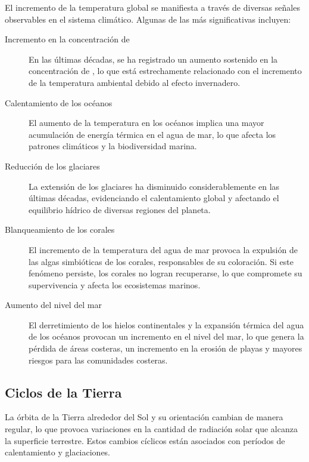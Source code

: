 El incremento de la temperatura global se manifiesta a través de diversas señales observables en el sistema climático. Algunas de las más significativas incluyen:

\begin{description}
    \item[Incremento en la concentración de ] En las últimas décadas, se ha registrado un aumento sostenido en la concentración de , lo que está estrechamente relacionado con el incremento de la temperatura ambiental debido al efecto invernadero.
    
    \item[Calentamiento de los océanos] El aumento de la temperatura en los océanos implica una mayor acumulación de energía térmica en el agua de mar, lo que afecta los patrones climáticos y la biodiversidad marina.
    
    \item[Reducción de los glaciares] La extensión de los glaciares ha disminuido considerablemente en las últimas décadas, evidenciando el calentamiento global y afectando el equilibrio hídrico de diversas regiones del planeta.
    
    \item[Blanqueamiento de los corales] El incremento de la temperatura del agua de mar provoca la expulsión de las algas simbióticas de los corales, responsables de su coloración. Si este fenómeno persiste, los corales no logran recuperarse, lo que compromete su supervivencia y afecta los ecosistemas marinos.
    
    \item[Aumento del nivel del mar] El derretimiento de los hielos continentales y la expansión térmica del agua de los océanos provocan un incremento en el nivel del mar, lo que genera la pérdida de áreas costeras, un incremento en la erosión de playas y mayores riesgos para las comunidades costeras.
\end{description}

\subsection{Ciclos de la Tierra}

La órbita de la Tierra alrededor del Sol y su orientación cambian de manera regular, lo que provoca variaciones en la cantidad de radiación solar que alcanza la superficie terrestre. Estos cambios cíclicos están asociados con períodos de calentamiento y glaciaciones. 

